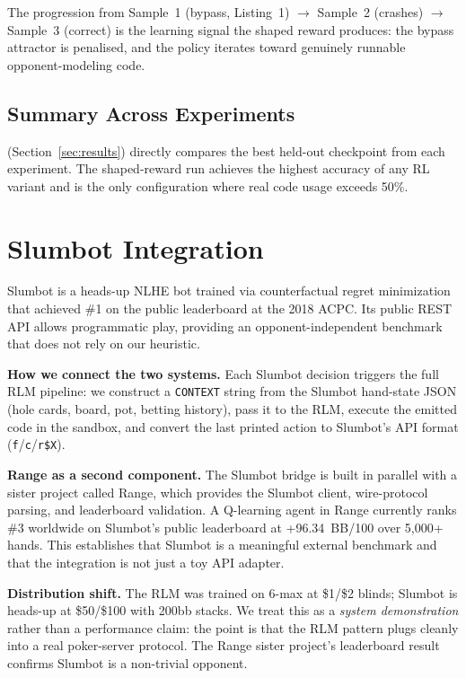 \documentclass{article}
\begin{document}
The progression from Sample~1 (bypass, Listing~1) $\to$ Sample~2
(crashes) $\to$ Sample~3 (correct) is the learning signal the shaped
reward produces: the bypass attractor is penalised, and the policy
iterates toward genuinely runnable opponent-modeling code.

\subsection{Summary Across Experiments}

 (Section~\ref{sec:results}) directly compares the best
held-out checkpoint from each experiment.
The shaped-reward run achieves the highest accuracy of any RL variant
and is the only configuration where real code usage exceeds 50\%.

\section{Slumbot Integration}

Slumbot \citep{slumbot} is a heads-up NLHE bot trained via
counterfactual regret minimization that achieved \#1 on the public
leaderboard at the 2018 ACPC.
Its public REST API allows programmatic play, providing an
opponent-independent benchmark that does not rely on our heuristic.

\textbf{How we connect the two systems.}
Each Slumbot decision triggers the full RLM pipeline: we construct a
\texttt{CONTEXT} string from the Slumbot hand-state JSON (hole cards,
board, pot, betting history), pass it to the RLM, execute the emitted
code in the sandbox, and convert the last printed action to Slumbot's
API format (\texttt{f}/\texttt{c}/\texttt{r\$X}).

\textbf{Range as a second component.}
The Slumbot bridge is built in parallel with a sister project called
Range, which provides the Slumbot client, wire-protocol parsing, and
leaderboard validation.  A Q-learning agent in Range currently ranks
\#3 worldwide on Slumbot's public leaderboard at +96.34~BB/100 over
5,000+ hands.  This establishes that Slumbot is a meaningful external
benchmark and that the integration is not just a toy API adapter.

\textbf{Distribution shift.}
The RLM was trained on 6-max at \$1/\$2 blinds; Slumbot is heads-up
at \$50/\$100 with 200bb stacks.
We treat this as a \emph{system demonstration} rather than a
performance claim: the point is that the RLM pattern plugs cleanly
into a real poker-server protocol.
The Range sister project's leaderboard result confirms Slumbot is a
non-trivial opponent.
\end{document}

